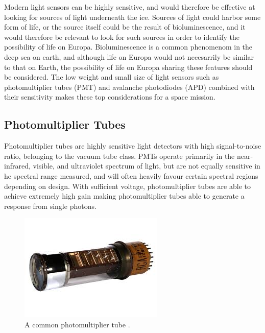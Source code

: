 
Modern light sensors can be highly sensitive, and would therefore be effective at looking for sources of light underneath the ice. Sources of light could harbor some form of life, or the source itself could be the result of bioluminescence, and it would therefore be relevant to look for such sources in order to identify the possibility of life on Europa. Bioluminescence is a common phenomenom in the deep sea on earth, and although life on Europa would not necesarrily be similar to that on Earth, the possibility of life on Europa sharing these features should be considered. The low weight and small size of light sensors such as photomultiplier tubes (PMT) and avalanche photodiodes (APD) combined with their sensitivity makes these top considerations for a space mission. 

\subsection{Photomultiplier Tubes}

Photomultiplier tubes are highly sensitive light detectors with high signal-to-noise ratio, belonging to the vacuum tube class. PMTs operate primarily in the near-infrared, visible, and ultraviolet spectrum of light, but are not equally sensitive in he spectral range measured, and will often heavily favour certain spectral regions depending on design. With sufficient voltage, photomultiplier tubes are able to achieve extremely high gain making photomultiplier tubes able to generate a response from single photons.

\begin{figure}[htb]
\begin{center}
\includegraphics[scale=0.6]{figures/RCS/photomultiplier_tube}
\caption{A common photomultiplier tube \cite{PMT_picture}.}
\label{fig:PMT}
\end{center}
\end{figure}

